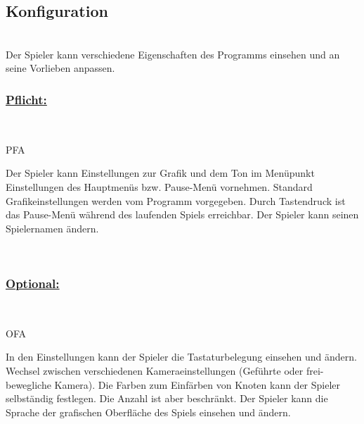 %
%


\subsection{Konfiguration}

%
%
\renewcommand{\K}{}
%
%

~\\
Der Spieler kann verschiedene Eigenschaften des Programms einsehen und an seine Vorlieben anpassen.
\\

%
%
\subsubsection*{\underline{Pflicht:}}~\\

\begin{ids}{\gls{PFA\K}}

	\id[ 10] Der Spieler kann Einstellungen zur Grafik und dem Ton im Menüpunkt Einstellungen des Hauptmenüs bzw. Pause-Menü vornehmen.
 	\id[ 20] Standard Grafikeinstellungen werden vom Programm vorgegeben.
 	\id[ 30] Durch Tastendruck ist das Pause-Menü während des laufenden Spiels erreichbar.
 	\id[ 40] Der Spieler kann seinen Spielernamen ändern.
 	
 	
	
\end{ids}

~\\


%
%
\subsubsection*{\underline{Optional:}}~\\


\begin{ids}{\gls{OFA\K}}

	\id[ 50] In den Einstellungen kann der Spieler die Tastaturbelegung einsehen und  ändern.
 	\id[60] Wechsel zwischen verschiedenen Kameraeinstellungen (Geführte oder frei-bewegliche Kamera).
 	\id[ 70] Die Farben zum Einfärben von Knoten kann der Spieler selbständig festlegen. Die Anzahl ist aber beschränkt.
 	\id[ 80] Der Spieler kann die Sprache der grafischen Oberfläche des Spiels einsehen und ändern.
 	
 	
	
\end{ids}

~\\